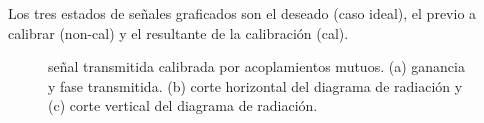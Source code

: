 Los tres estados de señales graficados son el deseado (caso ideal), el previo a calibrar (non-cal) y el resultante de la
calibración (cal).
\begin{figure}[H]
	\centering

	\caption{señal transmitida calibrada por acoplamientos mutuos. (a) ganancia y fase transmitida. (b) corte horizontal del 
	diagrama de radiación y (c) corte vertical del diagrama de radiación.}
	\label{fig:compErrMutual10degCol}
\end{figure}

